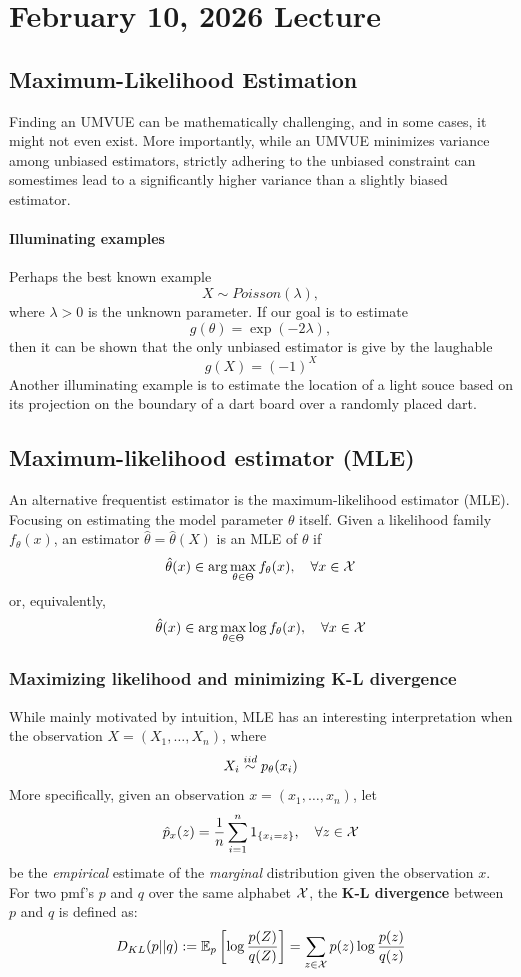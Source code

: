 \documentclass[11pt]{book}
\begin{document}

\newcommand{\Cov}{\mathrm{Cov}}

\theoremstyle{definition}
\newtheorem{exmp}{Example}[section]
\newtheorem{lemma}{Lemma}[section]

\chapter{February 10, 2026 Lecture}
\section{Maximum-Likelihood Estimation}
Finding an UMVUE can be mathematically challenging, and in some cases, it might not even exist. More importantly, while an UMVUE minimizes variance 
among unbiased estimators, strictly adhering to the unbiased constraint can somestimes lead to a significantly higher variance than a slightly biased estimator.
\subsubsection{Illuminating examples}
Perhaps the best known example 
\[
  X \sim Poisson(\lambda),
\]
where $\lambda > 0$ is the unknown parameter. If our goal is to estimate 
\[
  g(\theta) = \exp(-2\lambda),
\] 
then it can be shown that the only unbiased estimator is give by the laughable 
\[
  \hat{g}(X) = (-1)^X 
\]
Another illuminating example is to estimate the location of a light souce based on its projection on the boundary of 
a dart board over a randomly placed dart.
\section{Maximum-likelihood estimator (MLE)}
An alternative frequentist estimator is the maximum-likelihood estimator (MLE). Focusing on estimating the model parameter $\theta$ itself. Given a likelihood 
family $f_\theta(x)$, an estimator $\hat{\theta} = \hat{\theta}(X)$ is an MLE of $\theta$ if 
\[
  \hat{\theta}(x) \in \arg\max_{\theta\in\Theta} f_\theta(x), \quad \forall x\in\mathcal{X}
\]
or, equivalently,
\[
  \hat{\theta}(x) \in \arg\max_{\theta\in\Theta} \log f_\theta(x), \quad \forall x\in\mathcal{X}
\]
\subsection{Maximizing likelihood and minimizing K-L divergence}
While mainly motivated by intuition, MLE has an interesting interpretation when the observation $X = (X_1, \dots, X_n)$, where 
\[
  X_i \overset{iid}{\sim} p_\theta(x_i)
\]
More specifically, given an observation $x = (x_1, \dots, x_n)$, let 
\[
  \hat{p}_x (z) = \frac{1}{n}\sum_{i=1}^n 1_{\{x_i=z\}}, \quad \forall z \in\mathcal{X} 
\]
be the \textit{empirical} estimate of the \textit{marginal} distribution given the observation $x$. For two pmf's $p$ and $q$ 
over the same alphabet $\mathcal{X}$, the \textbf{K-L divergence} between $p$ and $q$ is defined as: 
\[
  D_{KL}(p || q) := \mathbb{E}_p \left[ \log\frac{p(Z)}{q(Z)} \right] = \sum_{z\in\mathcal{X}} p(z) \log \frac{p(z)}{q(z)}
\]
\end{document}
